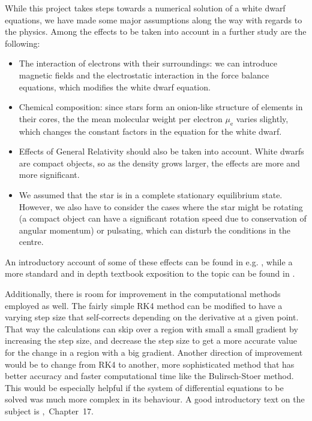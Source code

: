\documentclass[]{article}
\begin{document}
	While this project takes steps towards a numerical solution of a white dwarf equations, we have made some major assumptions along the way with regards to the physics. Among the effects to be taken into account in a further study are the following:
	\begin{itemize}
		\item The interaction of electrons with their surroundings: we can introduce magnetic fields and the electrostatic interaction in the force balance equations, which modifies the white dwarf equation.
		\item Chemical composition: since stars form an onion-like structure of elements in their cores, the the mean molecular weight per electron $\mu_\mathrm{e}$ varies slightly, which changes the constant factors in the equation for the white dwarf.
		\item Effects of General Relativity should also be taken into account. White dwarfs are compact objects, so as the density grows larger, the effects are more and more significant.
		\item We assumed that the star is in a complete stationary equilibrium state. However, we also have to consider the cases where the star might be rotating (a compact object can have a significant rotation speed due to conservation of angular momentum) or pulsating, which can disturb the conditions in the centre.
	\end{itemize}
	An introductory account of some of these effects can be found in e.g. \cite{Sagert2005}, while a more standard and in depth textbook exposition to the topic can be found in \cite{Shapiro1991}.

	Additionally, there is room for improvement in the computational methods employed as well. The fairly simple RK4 method can be modified to have a varying step size that self-corrects depending on the derivative at a given point. That way the calculations can skip over a region with small a small gradient by increasing the step size, and decrease the step size to get a more accurate value for the change in a region with a big gradient. Another direction of improvement would be to change from RK4 to another, more sophisticated method that has better accuracy and faster computational time like the Bulirsch-Stoer method. This would be especially helpful if the system of differential equations to be solved was much more complex in its behaviour. A good introductory text on the subject is \cite{Press2007},~Chapter~17.
\end{document}
